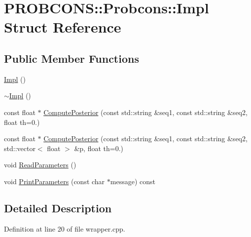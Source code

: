 \hypertarget{struct_p_r_o_b_c_o_n_s_1_1_probcons_1_1_impl}{\section{P\+R\+O\+B\+C\+O\+N\+S\+:\+:Probcons\+:\+:Impl Struct Reference}
\label{struct_p_r_o_b_c_o_n_s_1_1_probcons_1_1_impl}
}
\subsection*{Public Member Functions}
\begin{DoxyCompactItemize}
\item 
\hyperlink{struct_p_r_o_b_c_o_n_s_1_1_probcons_1_1_impl_a4af4223b7795e5be4d06b139ea5bd90f}{Impl} ()
\item 
\hyperlink{struct_p_r_o_b_c_o_n_s_1_1_probcons_1_1_impl_aa000e761a812f75c2350a2a03ca5b602}{$\sim$\+Impl} ()
\item 
const float $\ast$ \hyperlink{struct_p_r_o_b_c_o_n_s_1_1_probcons_1_1_impl_ab9c0fda5290d44136f5d6f3c03e04e6d}{Compute\+Posterior} (const std\+::string \&seq1, const std\+::string \&seq2, float th=0.)
\item 
const float $\ast$ \hyperlink{struct_p_r_o_b_c_o_n_s_1_1_probcons_1_1_impl_a1fdbb42452bbb35617f4c2c77ec68bfa}{Compute\+Posterior} (const std\+::string \&seq1, const std\+::string \&seq2, std\+::vector$<$ float $>$ \&p, float th=0.)
\item 
void \hyperlink{struct_p_r_o_b_c_o_n_s_1_1_probcons_1_1_impl_a22d56659c4c650ba5c992984465c1d26}{Read\+Parameters} ()
\item 
void \hyperlink{struct_p_r_o_b_c_o_n_s_1_1_probcons_1_1_impl_aacc283755a37d7205dd4a34d0d62fdb2}{Print\+Parameters} (const char $\ast$message) const 
\end{DoxyCompactItemize}


\subsection{Detailed Description}


Definition at line 20 of file wrapper.\+cpp.



